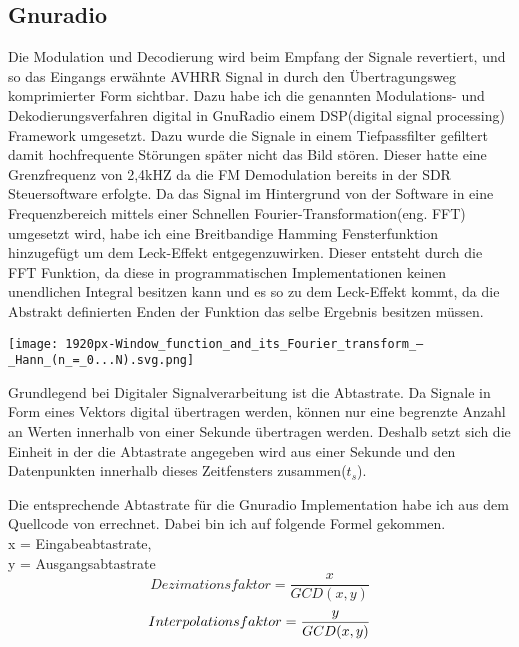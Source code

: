 \begin{multicols*}{2}
    \subsection*{Gnuradio}
    Die Modulation und Decodierung wird beim Empfang der Signale revertiert, und so das Eingangs erwähnte AVHRR Signal in durch den Übertragungsweg komprimierter Form sichtbar.
    Dazu habe ich die genannten Modulations- und Dekodierungsverfahren digital in GnuRadio \cite[]{Gnuradio} einem DSP(digital signal processing) Framework umgesetzt. Dazu wurde die Signale in einem Tiefpassfilter gefiltert damit hochfrequente Störungen später nicht das Bild stören. Dieser hatte eine Grenzfrequenz von 2,4kHZ da die FM Demodulation bereits in der SDR Steuersoftware erfolgte. Da das Signal im Hintergrund von der Software in eine Frequenzbereich mittels einer Schnellen Fourier-Transformation(eng. FFT) umgesetzt wird, habe ich eine Breitbandige Hamming Fensterfunktion hinzugefügt um dem Leck-Effekt entgegenzuwirken. Dieser entsteht durch die FFT Funktion, da diese in programmatischen Implementationen keinen unendlichen Integral besitzen kann und es so zu dem Leck-Effekt kommt, da die Abstrakt definierten Enden der Funktion das selbe Ergebnis besitzen müssen.

    \begin{center}
        \centering
        \texttt{[image: 1920px-Window\_function\_and\_its\_Fourier\_transform\_–\_Hann\_(n\_=\_0...N).svg.png]}
    \end{center} 
    
    Grundlegend bei Digitaler Signalverarbeitung ist die Abtastrate. Da Signale in Form eines Vektors digital übertragen werden, können nur eine begrenzte Anzahl an Werten innerhalb von einer Sekunde übertragen werden. Deshalb setzt sich die Einheit in der die Abtastrate angegeben wird aus einer Sekunde und den Datenpunkten innerhalb dieses Zeitfensters zusammen(\( t_s \)).

    Die entsprechende Abtastrate für die Gnuradio Implementation habe ich aus dem Quellcode von \cite{APT-How_it_works} errechnet. Dabei bin ich auf folgende Formel gekommen.
    \\
    x = Eingabeabtastrate,\\ y = Ausgangsabtastrate
    \begin{equation}
        Dezimationsfaktor =  \frac{x}{GCD(x,y)}
    \end{equation}
    \begin{equation}
        Interpolationsfaktor =  \frac{y}{GCD(x,y)} \\
    \end{equation}
    


\end{multicols*}
